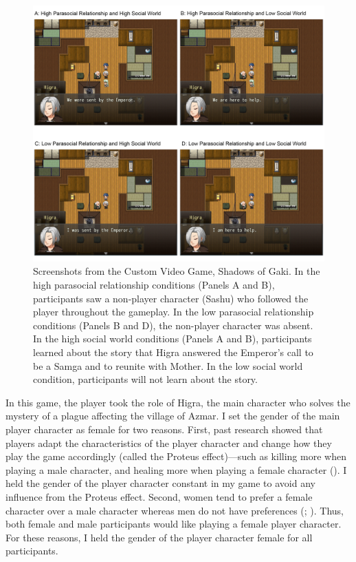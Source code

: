 \documentclass[
]{udthesis}
\begin{document}
\begin{figure}
\includegraphics[width=0.9\linewidth]{images/sog-screenshots} \caption{Screenshots from the Custom Video Game, Shadows of Gaki. In the high parasocial relationship conditions (Panels A and B), participants saw a non-player character (Sashu) who followed the player throughout the gameplay. In the low parasocial relationship conditions (Panels B and D), the non-player character was absent. In the high social world conditions (Panels A and B), participants learned about the story that Higra answered the Emperor's call to be a Samga and to reunite with Mother. In the low social world condition, participants will not learn about the story.}\label{fig:s3-screenshots}
\end{figure}

In this game, the player took the role of Higra, the main character who
solves the mystery of a plague affecting the village of Azmar. I set the
gender of the main player character as female for two reasons. First,
past research showed that players adapt the characteristics of the
player character and change how they play the game accordingly (called
the Proteus effect)---such as killing more when playing a male
character, and healing more when playing a female character
(). I held the gender of the player character
constant in my game to avoid any influence from the Proteus effect.
Second, women tend to prefer a female character over a male character
whereas men do not have preferences (; ). Thus, both female and male participants would
like playing a female player character. For these reasons, I held the
gender of the player character female for all participants.
\end{document}
